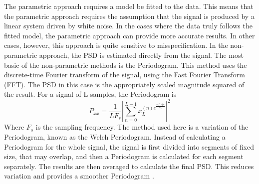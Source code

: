\documentclass[12pt, a4paper, fleqn]{memoir}%
\begin{document}
The parametric approach requires a model be fitted to the data. This means that the parametric approach requires the assumption that the signal is produced by a linear system driven by white noise. In the cases where the data truly follows the fitted model, the parametric approach can provide more accurate results. In other cases, however, this approach is quite sensitive to misspecification. In the non-parametric approach, the PSD is estimated directly from the signal. The most basic of the non-parametric methods is the Periodogram. This method uses the discrete-time Fourier transform of the signal, using the Fast Fourier Transform (FFT). The PSD in this case is the appropriately scaled magnitude squared of the result.
For a signal of L samples, the Periodogram is
$$P_{xx}=\frac{1}{LF_s}|\sum_{n=0}^{L-1}x_L^{(n)e^{\frac{-j2\pi fn}{F_s}}}|^{2}$$
Where $F_s$ is the sampling frequency.
The method used here is a variation of the Periodogram, known as the Welch Periodogram. Instead of calculating a Periodogram for the whole signal, the signal is first divided into segments of fixed size, that may overlap, and then a Periodogram is calculated for each segment separately. The results are then averaged to calculate the final PSD. This reduces variation and provides a smoother Periodogram \cite{john1996digital}.
\end{document}
